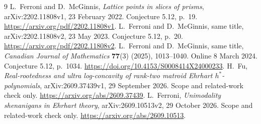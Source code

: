 \documentclass[11pt]{article}
\begin{document}
\begin{thebibliography}{9}
 L.~Ferroni and D.~McGinnis,
\emph{Lattice points in slices of prisms}, arXiv:2202.11808v1, 23 February 2022. Conjecture 5.12, p.~19.
\url{https://arxiv.org/pdf/2202.11808v1}.
 L.~Ferroni and D.~McGinnis,
same title, arXiv:2202.11808v2, 23 May 2023. Conjecture 5.12, p.~20.
\url{https://arxiv.org/pdf/2202.11808v2}.
 L.~Ferroni and D.~McGinnis,
same title, \emph{Canadian Journal of Mathematics} \textbf{77}(3) (2025), 1013--1040. Online 8 March 2024. Conjecture 5.12, p.~1034.
\url{https://doi.org/10.4153/S0008414X24000233}.
 H.~Fu, \emph{Real-rootedness and ultra log-concavity of rank-two matroid Ehrhart $h^*$-polynomials}, arXiv:2609.37439v1, 29 September 2026. Scope and related-work check only.
\url{https://arxiv.org/abs/2609.37439}.
 L.~Ferroni, \emph{Unimodality shenanigans in Ehrhart theory}, arXiv:2609.10513v2, 29 October 2026. Scope and related-work check only.
\url{https://arxiv.org/abs/2609.10513}.
\end{thebibliography}
\end{document}
